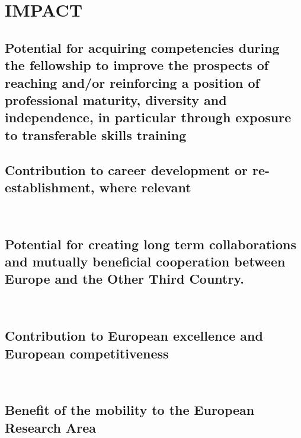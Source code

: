\section{IMPACT} %
\label{sec:impact}
\subsection{Potential for acquiring competencies during the fellowship to improve the prospects of 
reaching and/or reinforcing a position of professional maturity, diversity and independence, 
in particular through exposure to transferable skills training}

\subsection{Contribution to career development or re-establishment, where relevant} \\
\subsection{Potential for creating long term collaborations and mutually beneficial cooperation between 
Europe and the Other Third Country.} \\
\subsection{Contribution to European excellence and European competitiveness} \\
\subsection{Benefit of the mobility to the European Research Area} \\
 \\
\newpage